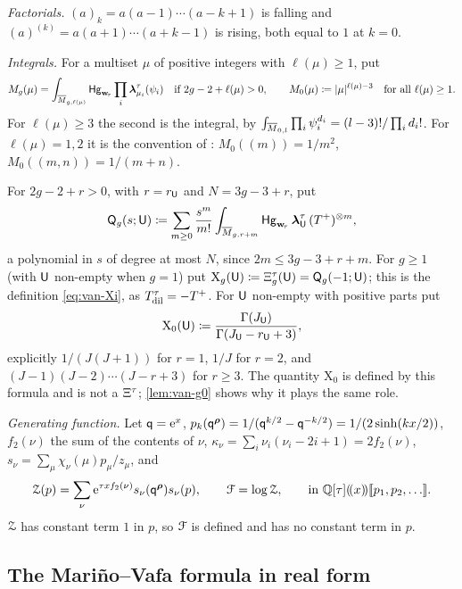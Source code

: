 \emph{Factorials.} $(a)_k=a(a-1)\cdots(a-k+1)$ is falling and $(a)^{(k)}=a(a+1)\cdots(a+k-1)$ is rising, both equal to $1$ at $k=0$.

\emph{Integrals.} For a multiset $\mu$ of positive integers with $\ell(\mu)\geq 1$, put
\[
M_g(\mu)=\int_{\overline{M}_{g,\ell(\mu)}}\mathsf{Hg}_{\mathbf{w}_{\!\tau}}\prod_i\boldsymbol{\lambda}^{\tau}_{\mu_i}(\psi_i)\quad\text{if }2g-2+\ell(\mu)>0,\qquad
M_0(\mu)\coloneqq\lvert\mu\rvert^{\ell(\mu)-3}\quad\text{for all }\ell(\mu)\geq 1.
\]
For $\ell(\mu)\geq 3$ the second is the integral, by $\int_{\overline{M}_{0,l}}\prod_i\psi_i^{d_i}=(l-3)!/\prod_i d_i!$. For $\ell(\mu)=1,2$ it is the convention of \cite{LLZ03}: $M_0((m))=1/m^2$, $M_0((m,n))=1/(m+n)$.

For $2g-2+r>0$, with $r=r_{\mathsf{U}}$ and $N=3g-3+r$, put
\[
\mathsf{Q}_g(s;\mathsf{U})\coloneqq\sum_{m\geq 0}\frac{s^m}{m!}\int_{\overline{M}_{g,r+m}}\mathsf{Hg}_{\mathbf{w}_{\!\tau}}\,\boldsymbol{\lambda}^{\tau}_{\mathsf{U}}\,(T^{+})^{\otimes m},
\]
a polynomial in $s$ of degree at most $N$, since $2m\leq 3g-3+r+m$. For $g\geq 1$ (with $\mathsf{U}$ non-empty when $g=1$) put $\mathrm{X}_g(\mathsf{U})\coloneqq\Xi^{\tau}_g(\mathsf{U})=\mathsf{Q}_g(-1;\mathsf{U})$; this is the definition \eqref{eq:van-Xi}, as $T_{\mathrm{dil}}^{\tau}=-T^{+}$. For $\mathsf{U}$ non-empty with positive parts put
\[
\mathrm{X}_0(\mathsf{U})\coloneqq\frac{\Gamma(J_{\mathsf{U}})}{\Gamma(J_{\mathsf{U}}-r_{\mathsf{U}}+3)},
\]
explicitly $1/(J(J+1))$ for $r=1$, $1/J$ for $r=2$, and $(J-1)(J-2)\cdots(J-r+3)$ for $r\geq 3$. The quantity $\mathrm{X}_0$ is defined by this formula and is not a $\Xi^{\tau}$; \cref{lem:van-g0} shows why it plays the same role.

\emph{Generating function.} Let $\mathsf{q}=\mathrm{e}^x$, $p_k(\mathsf{q}^{\boldsymbol{\rho}})=1/(\mathsf{q}^{k/2}-\mathsf{q}^{-k/2})=1/(2\sinh(kx/2))$, $f_2(\nu)$ the sum of the contents of $\nu$, $\kappa_\nu=\sum_i\nu_i(\nu_i-2i+1)=2f_2(\nu)$, $s_\nu=\sum_\mu\chi_\nu(\mu)p_\mu/z_\mu$, and
\[
\MVZ(p)=\sum_\nu\re^{\tau xf_2(\nu)}s_\nu(\mathsf{q}^{\bwy})s_\nu(p),\qquad \MVF=\log\MVZ,\qquad\text{in }\bbQ[\tau]\lser{x}\fps{p_1,p_2,\dots}.
\]
$\mathcal{Z}$ has constant term $1$ in $p$, so $\mathcal{F}$ is defined and has no constant term in $p$.

\subsection{The Mari\~no--Vafa formula in real form}
\label{sec:van-MV}

